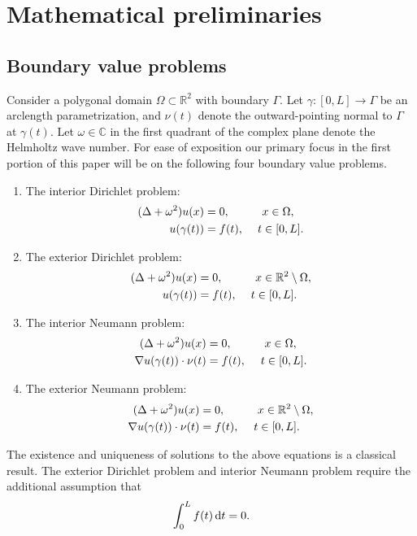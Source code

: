 \section{Mathematical preliminaries}
\subsection{Boundary value problems}
Consider a polygonal domain $\Omega \subset \mathbb{R}^2$ with boundary $\Gamma.$ 
Let $\gamma:[0,L] \to \Gamma$ be an arclength parametrization, and $\nu(t)$ denote the 
outward-pointing normal to $\Gamma$ at $\gamma(t).$  
Let $\omega \in \mathbb{C}$ in the first quadrant of the complex plane denote the 
Helmholtz wave number.
For ease of exposition our primary focus in the first portion of this paper will be on the 
following four boundary value problems.
\begin{enumerate}
\item The interior Dirichlet problem:
\begin{align}\label{eqn:BVPID}
(\Delta + \omega^2)u(x) &= 0, \hspace{1 cm} x \in \Omega,\\
u(\gamma(t)) &= f(t), \hspace{0.43 cm} t \in [0,L].
\end{align}

\item The exterior Dirichlet problem:
\begin{align}\label{eqn:BCPED}
(\Delta + \omega^2) u(x) &= 0, \hspace{1 cm} x \in \mathbb{R}^2\setminus\Omega,\\
u(\gamma(t)) &= f(t), \hspace{0.43 cm} t \in[0,L].
\end{align}

\item The interior Neumann problem:
\begin{align}\label{eqn:BVPIN}
(\Delta + \omega^2) u(x) &= 0, \hspace{1 cm} x \in \Omega,\\
\nabla u(\gamma(t))\cdot \nu(t)  &= f(t), \hspace{0.45 cm} t\in [0,L].
\end{align}

\item The exterior Neumann problem:
\begin{align}\label{eqn:BVPEN}
(\Delta + \omega^2) u(x) &= 0, \hspace{1 cm} x \in \mathbb{R}^2\setminus\Omega,\\
\nabla u(\gamma(t))\cdot \nu(t)  &= f(t), \hspace{0.45 cm} t\in [0,L].
\end{align}

\end{enumerate}

\begin{remark}
The existence and uniqueness of solutions to the above equations is a classical result. 
The exterior Dirichlet problem and interior Neumann problem require the additional assumption that
$$\int_0^L f(t)\,{\rm d}t = 0.$$
\end{remark}
